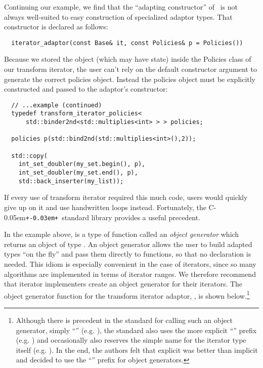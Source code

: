 \documentclass{netobjectdays}
\newcommand{\Cpp}{C\kern-0.05em\texttt{+\kern-0.03em+}}
\newcommand{\iteratoradaptor}{\code{iterator\_\-adaptor}}
\begin{document}
Continuing our example, we find that the ``adapting constructor'' of
\iteratoradaptor\ is not always well-suited to easy construction of
specialized adaptor types. That constructor is declared as follows:

{\footnotesize
\begin{verbatim}
  iterator_adaptor(const Base& it, const Policies& p = Policies())
\end{verbatim}
}

Because we stored the  object
(which may have state) inside the Policies class of our transform
iterator, the user can't rely on the default constructor argument to
generate the correct policies object. Instead the policies object must
be explicitly constructed and passed to the adaptor's
constructor:

{\footnotesize
\begin{verbatim}
  // ...example (continued)
  typedef transform_iterator_policies<
      std::binder2nd<std::multiplies<int> > > policies;

  policies p(std::bind2nd(std::multiplies<int>(),2));

  std::copy(
    int_set_doubler(my_set.begin(), p),
    int_set_doubler(my_set.end(), p),
    std::back_inserter(my_list));
\end{verbatim}
}

If every use of transform iterator required this much code, users
would quickly give up on it and use handwritten loops
instead. Fortunately, the \Cpp\ standard library provides a useful
precedent.

In the example above,  is a type of
function called an \emph{object generator} which returns an object of
type . An object
generator allows the user to build adapted types ``on the fly'' and
pass them directly to functions, so that no declaration is needed.
This idiom is especially convenient in the case of iterators, since so
many algorithms are implemented in terms of iterator ranges. We
therefore recommend that iterator implementers create an object
generator for their iterators. The object generator function for the
transform iterator adaptor, , is
shown below.\footnote{ Although there is precedent in the standard for
  calling such an object generator, simply
  ``'' (e.g.
  ), the standard also uses the more
  explicit ``'' prefix (e.g. )
  and occasionally also reserves the simple name for the iterator type
  itself (e.g. ).  In the end, the
  authors felt that explicit was better than implicit and decided to
  use the ``'' prefix for object generators.  }
\end{document}
